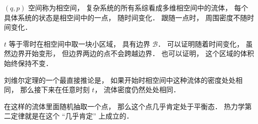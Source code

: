 
\begin{issues}
\issueDraft
\end{issues}

$(q, p)$ 空间称为相空间， 复杂系统的所有系综看成多维相空间中的流体， 每个具体系统的状态是相空间中的一点， 随时间变化． 跟随一点时， 周围密度不随时间变化．

$t$ 等于零时在相空间中取一块小区域， 具有边界 $\mathcal B$． 可以证明随着时间变化， 虽然边界开始变形， 但边界两边的点不会跨越边界． 也可以证明， 这个区域的体积始终保持不变．

刘维尔定理的一个最直接推论是， 如果开始时相空间中这种流体的密度处处相同， 那么接下来在任意时刻 $t$， 流体密度仍然处处相同．

在这样的流体里面随机抽取一个点， 那么这个点几乎肯定处于平衡态． 热力学第二定律就是在这个 “几乎肯定” 上成立的．
